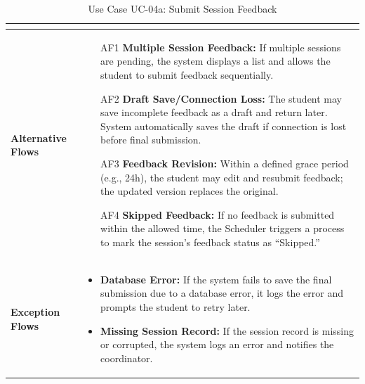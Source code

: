 \begin{table}[H]
\begin{tabular}{|p{3cm}|p{11cm}|}
\begin{itemize}
\end{itemize} \\ 
\hline
\textbf{Alternative Flows} & 
\begin{itemize}
    \item[AF1] \textbf{Multiple Session Feedback:} If multiple sessions are pending, the system displays a list and allows the student to submit feedback sequentially.
    \item[AF2] \textbf{Draft Save/Connection Loss:} The student may save incomplete feedback as a draft and return later. System automatically saves the draft if connection is lost before final submission.
    \item[AF3] \textbf{Feedback Revision:} Within a defined grace period (e.g., 24h), the student may edit and resubmit feedback; the updated version replaces the original.
    \item[AF4] \textbf{Skipped Feedback:} If no feedback is submitted within the allowed time, the Scheduler triggers a process to mark the session's feedback status as ``Skipped.'' 
\end{itemize} \\ 
\hline
\textbf{Exception Flows} & 
\begin{itemize}
    \item \textbf{Database Error:} If the system fails to save the final submission due to a database error, it logs the error and prompts the student to retry later.
    \item \textbf{Missing Session Record:} If the session record is missing or corrupted, the system logs an error and notifies the coordinator.
\end{itemize} \\ 
\hline
\end{tabular}
\caption{Use Case UC-04a: Submit Session Feedback}
\end{table}



